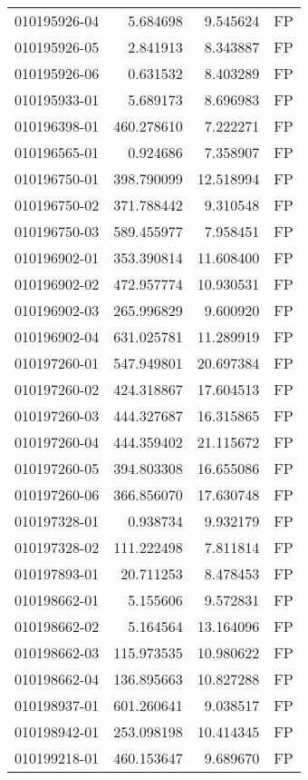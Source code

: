 \begin{tabular}{lrrl}
010195926-04 &    5.684698 &     9.545624 &   FP \\
010195926-05 &    2.841913 &     8.343887 &   FP \\
010195926-06 &    0.631532 &     8.403289 &   FP \\
010195933-01 &    5.689173 &     8.696983 &   FP \\
010196398-01 &  460.278610 &     7.222271 &   FP \\
010196565-01 &    0.924686 &     7.358907 &   FP \\
010196750-01 &  398.790099 &    12.518994 &   FP \\
010196750-02 &  371.788442 &     9.310548 &   FP \\
010196750-03 &  589.455977 &     7.958451 &   FP \\
010196902-01 &  353.390814 &    11.608400 &   FP \\
010196902-02 &  472.957774 &    10.930531 &   FP \\
010196902-03 &  265.996829 &     9.600920 &   FP \\
010196902-04 &  631.025781 &    11.289919 &   FP \\
010197260-01 &  547.949801 &    20.697384 &   FP \\
010197260-02 &  424.318867 &    17.604513 &   FP \\
010197260-03 &  444.327687 &    16.315865 &   FP \\
010197260-04 &  444.359402 &    21.115672 &   FP \\
010197260-05 &  394.803308 &    16.655086 &   FP \\
010197260-06 &  366.856070 &    17.630748 &   FP \\
010197328-01 &    0.938734 &     9.932179 &   FP \\
010197328-02 &  111.222498 &     7.811814 &   FP \\
010197893-01 &   20.711253 &     8.478453 &   FP \\
010198662-01 &    5.155606 &     9.572831 &   FP \\
010198662-02 &    5.164564 &    13.164096 &   FP \\
010198662-03 &  115.973535 &    10.980622 &   FP \\
010198662-04 &  136.895663 &    10.827288 &   FP \\
010198937-01 &  601.260641 &     9.038517 &   FP \\
010198942-01 &  253.098198 &    10.414345 &   FP \\
010199218-01 &  460.153647 &     9.689670 &   FP \\

\end{tabular}
